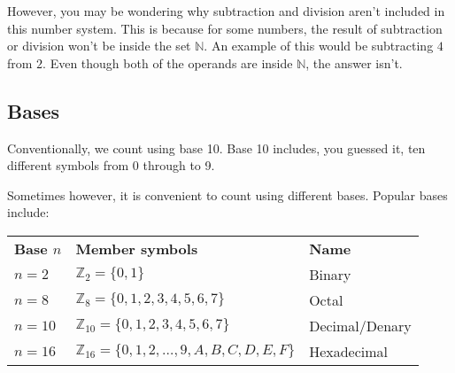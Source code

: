 \documentclass{article}
\begin{document}
However, you may be wondering why subtraction and division aren't included in this number system. This is because for some numbers, the result of subtraction or division won't be inside the set $\mathbb{N}$. An example of this would be subtracting $4$ from $2$. Even though both of the operands are inside $\mathbb{N}$, the answer isn't.

\subsection{Bases}

Conventionally, we count using base 10. Base 10 includes, you guessed it, ten different symbols from 0 through to 9.

Sometimes however, it is convenient to count using different bases. Popular bases include:

\begin{tabular}{l l l}
	{\bf Base $n$} & {\bf Member symbols} & {\bf Name}\\
	$n = 2$ & $\mathbb{Z}_2 = \{0, 1\}$ & Binary\\
	$n = 8$ & $\mathbb{Z}_8 = \{0, 1, 2, 3, 4, 5, 6, 7\}$ & Octal\\
	$n = 10$ & $\mathbb{Z}_{10} = \{0, 1, 2, 3, 4, 5, 6, 7\}$ & Decimal/Denary\\
	$n = 16$ & $\mathbb{Z}_{16} = \{0, 1, 2, \ldots ,9, A, B, C, D, E, F\}$ & Hexadecimal\\
\end{tabular}
\end{document}
